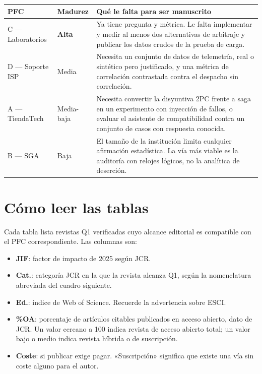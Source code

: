 \documentclass[11pt,a4paper]{article}
\begin{document}
\begin{center}
	\small
	\begin{tabular}{@{}p{3.1cm}p{2.2cm}p{9.6cm}@{}}
		\toprule
		\textbf{PFC} & \textbf{Madurez} & \textbf{Qué le falta para ser manuscrito} \\
		\midrule
		C --- Laboratorios & \textbf{Alta} & Ya tiene pregunta y métrica. Le falta implementar y medir al menos dos alternativas de arbitraje y publicar los datos crudos de la prueba de carga. \\
		\addlinespace
		D --- Soporte ISP & Media & Necesita un conjunto de datos de telemetría, real o sintético pero justificado, y una métrica de correlación contrastada contra el despacho sin correlación. \\
		\addlinespace
		A --- TiendaTech & Media-baja & Necesita convertir la disyuntiva 2PC frente a saga en un experimento con inyección de fallos, o evaluar el asistente de compatibilidad contra un conjunto de casos con respuesta conocida. \\
		\addlinespace
		B --- SGA & Baja & El tamaño de la institución limita cualquier afirmación estadística. La vía más viable es la auditoría con relojes lógicos, no la analítica de deserción. \\
		\bottomrule
	\end{tabular}
\end{center}

\section{Cómo leer las tablas}

Cada tabla lista revistas Q1 verificadas cuyo alcance editorial es compatible con el PFC correspondiente. Las columnas son:

\begin{itemize}[leftmargin=*,itemsep=3pt]
	\item \textbf{JIF}: factor de impacto de 2025 según JCR.
	\item \textbf{Cat.}: categoría JCR en la que la revista alcanza Q1, según la nomenclatura abreviada del cuadro siguiente.
	\item \textbf{Ed.}: índice de Web of Science. Recuerde la advertencia sobre ESCI.
	\item \textbf{\%OA}: porcentaje de artículos citables publicados en acceso abierto, dato de JCR. Un valor cercano a 100 indica revista de acceso abierto total; un valor bajo o medio indica revista híbrida o de suscripción.
	\item \textbf{Coste}: si publicar exige pagar. «Suscripción» significa que existe una vía sin coste alguno para el autor.
\end{itemize}
\end{document}
